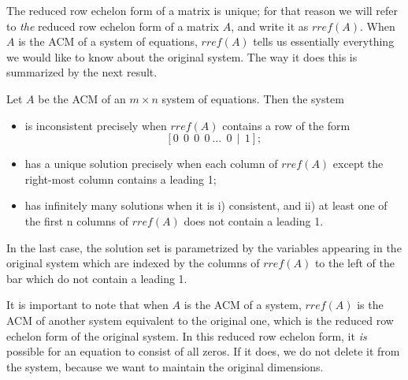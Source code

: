 \documentclass{ximera}
\begin{document}
The reduced row echelon form of a matrix is unique; for that reason we will refer to {\it the} reduced row echelon form of a matrix $A$, and write it as $rref(A)$. When $A$ is the ACM of a system of equations, $rref(A)$ tells us essentially everything we would like to know about the original system. The way it does this is summarized by the next result.

\begin{theorem} Let $A$ be the ACM of an $m\times n$ system of equations. Then the system
\begin{itemize}
\item is inconsistent precisely when $rref(A)$ contains a row of the form
\[
[0\ \ 0\ \ 0\ \ 0\ \dots\ \ 0\ \ |\ \ 1];
\]
\item has a unique solution precisely when each column of $rref(A)$ except the right-most column contains a leading 1;
\item has infinitely many solutions when it is i) consistent, and ii) at least one of the first n columns of $rref(A)$ does not contain a leading 1.
\end{itemize}
In the last case, the solution set is parametrized by the variables appearing in the original system which are indexed by the columns of $rref(A)$ to the left of the bar which do not contain a leading 1.
\end{theorem}

It is important to note that when $A$ is the ACM of a system, $rref(A)$ is the ACM of another system equivalent to the original one, which is the reduced row echelon form of the original system. In this reduced row echelon form, it {\it is} possible for an equation to consist of all zeros. If it does, we do not delete it from the system, because we want to maintain the original dimensions.
\end{document}
